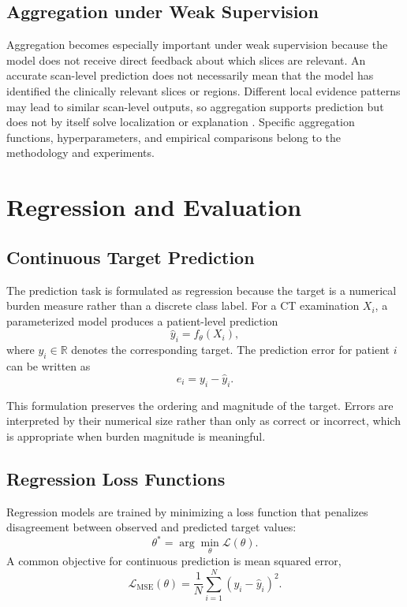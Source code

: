 \subsection{Aggregation under Weak Supervision}
\label{sec:aggregation_weak_supervision}

Aggregation becomes especially important under weak supervision because the model does not receive direct feedback about which slices are relevant. An accurate scan-level prediction does not necessarily mean that the model has identified the clinically relevant slices or regions. Different local evidence patterns may lead to similar scan-level outputs, so aggregation supports prediction but does not by itself solve localization or explanation \cite{djahnine2024weakly,almakky2025weakly}. Specific aggregation functions, hyperparameters, and empirical comparisons belong to the methodology and experiments.



\section{Regression and Evaluation}
\label{sec:regression_evaluation}

\subsection{Continuous Target Prediction}
\label{sec:continuous_target_prediction}

The prediction task is formulated as regression because the target is a numerical burden measure rather than a discrete class label. For a CT examination \(X_i\), a parameterized model produces a patient-level prediction
\[
\hat{y}_i = f_{\theta}(X_i),
\]
where \(y_i \in \mathbb{R}\) denotes the corresponding target. The prediction error for patient \(i\) can be written as
\[
e_i = y_i - \hat{y}_i.
\]

This formulation preserves the ordering and magnitude of the target. Errors are interpreted by their numerical size rather than only as correct or incorrect, which is appropriate when burden magnitude is meaningful.


\subsection{Regression Loss Functions}
\label{sec:regression_loss_functions}

Regression models are trained by minimizing a loss function that penalizes disagreement between observed and predicted target values:
\[
\theta^{*}
=
\arg\min_{\theta}
\mathcal{L}(\theta).
\]
A common objective for continuous prediction is mean squared error,
\[
\mathcal{L}_{\mathrm{MSE}}(\theta)
=
\frac{1}{N}
\sum_{i=1}^{N}
\left(y_i - \hat{y}_i\right)^2.
\]

